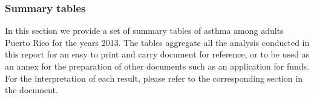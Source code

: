 \newpage
\subsubsection{Summary tables}
In this section we provide a set of summary tables of asthma among adults Puerto Rico for the years 2013. The tables aggregate all the analysis conducted in this report for an easy to print and carry document for reference, or to be used as an annex for the preparation of other documents such as an application for funds. For the interpretation of each result, please refer to the corresponding section in the document.

